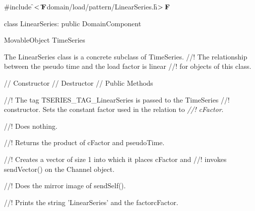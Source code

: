 
\indent \#include \f$<\tilde{ }{\bf F}$domain/load/pattern/LinearSeries.h\f$>{\bf F}$

\indent class LinearSeries: public DomainComponent

\indent MovableObject
\indent\indent TimeSeries
\indent\indent{}

\indent The LinearSeries class is a concrete subclass of TimeSeries.
//! The relationship between the pseudo time and the load factor is linear
//! for objects of this class.


\indent // Constructor 
\indent // Destructor 
\indent // Public Methods 

//! The tag TSERIES\_TAG\_LinearSeries is passed to the TimeSeries
//! constructor. Sets the constant factor used in the relation to {\em
//! cFactor}.

//! Does nothing.

//! Returns the product of \p cFactor and \p pseudoTime.

//! Creates a vector of size 1 into which it places \p cFactor and
//! invokes sendVector() on the Channel object.

//! Does the mirror image of sendSelf().

//! Prints the string 'LinearSeries' and the factor\p cFactor.
